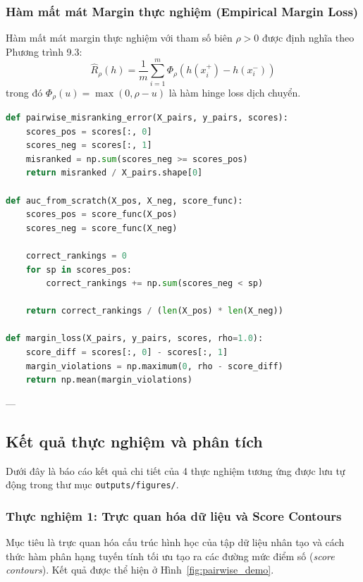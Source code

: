 \subsubsection{Hàm mất mát Margin thực nghiệm (Empirical Margin Loss)}
Hàm mất mát margin thực nghiệm với tham số biên $\rho > 0$ được định nghĩa theo Phương trình 9.3:
\begin{equation}
    \widehat{R}_{\rho}(h) = \frac{1}{m} \sum_{i=1}^m \Phi_{\rho}\left(h(x^+_i) - h(x^-_i)\right)
\end{equation}
trong đó $\Phi_{\rho}(u) = \max(0, \rho - u)$ là hàm hinge loss dịch chuyển.

\begin{lstlisting}[language=Python, caption={Cài đặt các độ đo phân hạng từ đầu}, label={lst:metrics_impl}]
def pairwise_misranking_error(X_pairs, y_pairs, scores):
    scores_pos = scores[:, 0]
    scores_neg = scores[:, 1]
    misranked = np.sum(scores_neg >= scores_pos)
    return misranked / X_pairs.shape[0]

def auc_from_scratch(X_pos, X_neg, score_func):
    scores_pos = score_func(X_pos)
    scores_neg = score_func(X_neg)
    
    correct_rankings = 0
    for sp in scores_pos:
        correct_rankings += np.sum(scores_neg < sp)
        
    return correct_rankings / (len(X_pos) * len(X_neg))

def margin_loss(X_pairs, y_pairs, scores, rho=1.0):
    score_diff = scores[:, 0] - scores[:, 1]
    margin_violations = np.maximum(0, rho - score_diff)
    return np.mean(margin_violations)
\end{lstlisting}

---

\subsection{Kết quả thực nghiệm và phân tích}
Dưới đây là báo cáo kết quả chi tiết của 4 thực nghiệm tương ứng được lưu tự động trong thư mục \texttt{outputs/figures/}.

\subsubsection{Thực nghiệm 1: Trực quan hóa dữ liệu và Score Contours}
Mục tiêu là trực quan hóa cấu trúc hình học của tập dữ liệu nhân tạo và cách thức hàm phân hạng tuyến tính tối ưu tạo ra các đường mức điểm số (\textit{score contours}). Kết quả được thể hiện ở Hình~\ref{fig:pairwise_demo}.

